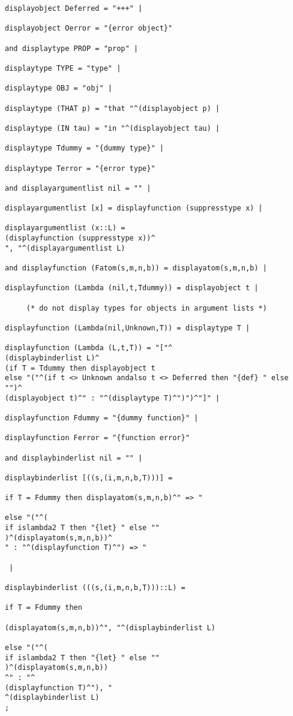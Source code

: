 \documentclass[12pt]{article}
\begin{document}
\begin{verbatim}
displayobject Deferred = "+++" |

displayobject Oerror = "{error object}"

and displaytype PROP = "prop" |

displaytype TYPE = "type" |

displaytype OBJ = "obj" |

displaytype (THAT p) = "that "^(displayobject p) |

displaytype (IN tau) = "in "^(displayobject tau) |

displaytype Tdummy = "{dummy type}" |

displaytype Terror = "{error type}"

and displayargumentlist nil = "" |

displayargumentlist [x] = displayfunction (suppresstype x) |

displayargumentlist (x::L) = 
(displayfunction (suppresstype x))^
", "^(displayargumentlist L) 

and displayfunction (Fatom(s,m,n,b)) = displayatom(s,m,n,b) |

displayfunction (Lambda (nil,t,Tdummy)) = displayobject t |

     (* do not display types for objects in argument lists *)
	 
displayfunction (Lambda(nil,Unknown,T)) = displaytype T |
	 
displayfunction (Lambda (L,t,T)) = "["^
(displaybinderlist L)^
(if T = Tdummy then displayobject t
else "("^(if t <> Unknown andalso t <> Deferred then "{def} " else "")^
(displayobject t)^" : "^(displaytype T)^")")^"]" |

displayfunction Fdummy = "{dummy function}" |

displayfunction Ferror = "{function error}"

and displaybinderlist nil = "" |

displaybinderlist [((s,(i,m,n,b,T)))] = 

if T = Fdummy then displayatom(s,m,n,b)^" => "

else "("^(
if islambda2 T then "{let} " else ""
)^(displayatom(s,m,n,b))^
" : "^(displayfunction T)^") => "

 |

displaybinderlist (((s,(i,m,n,b,T)))::L) = 

if T = Fdummy then

(displayatom(s,m,n,b))^", "^(displaybinderlist L)

else "("^(
if islambda2 T then "{let} " else ""
)^(displayatom(s,m,n,b))
^" : "^
(displayfunction T)^"), "
^(displaybinderlist L)
;


\end{verbatim}
\end{document}
